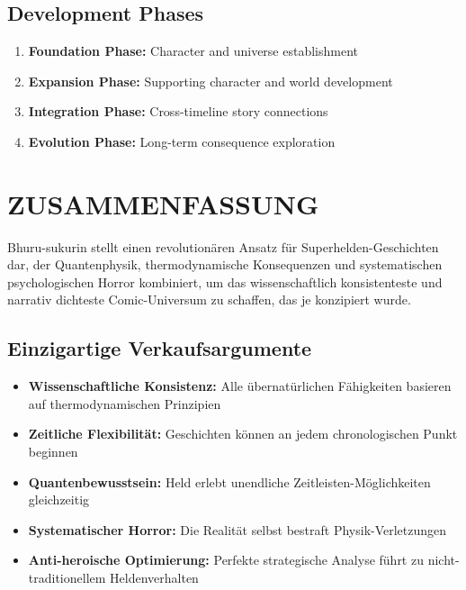 \documentclass[12pt,a4paper]{article}
\begin{document}
\subsection{Development Phases}
\begin{enumerate}
\item \textbf{Foundation Phase:} Character and universe establishment
\item \textbf{Expansion Phase:} Supporting character and world development
\item \textbf{Integration Phase:} Cross-timeline story connections
\item \textbf{Evolution Phase:} Long-term consequence exploration
\end{enumerate}

\newpage


\section{ZUSAMMENFASSUNG}

\begin{tcolorbox}[colback=lightgray,colframe=darkblue,title=\textbf{Kernkonzept}]
Bhuru-sukurin stellt einen revolutionären Ansatz für Superhelden-Geschichten dar, der Quantenphysik, thermodynamische Konsequenzen und systematischen psychologischen Horror kombiniert, um das wissenschaftlich konsistenteste und narrativ dichteste Comic-Universum zu schaffen, das je konzipiert wurde.
\end{tcolorbox}

\subsection{Einzigartige Verkaufsargumente}
\begin{itemize}
\item \textbf{Wissenschaftliche Konsistenz:} Alle übernatürlichen Fähigkeiten basieren auf thermodynamischen Prinzipien
\item \textbf{Zeitliche Flexibilität:} Geschichten können an jedem chronologischen Punkt beginnen
\item \textbf{Quantenbewusstsein:} Held erlebt unendliche Zeitleisten-Möglichkeiten gleichzeitig
\item \textbf{Systematischer Horror:} Die Realität selbst bestraft Physik-Verletzungen
\item \textbf{Anti-heroische Optimierung:} Perfekte strategische Analyse führt zu nicht-traditionellem Heldenverhalten
\end{itemize}
\end{document}
